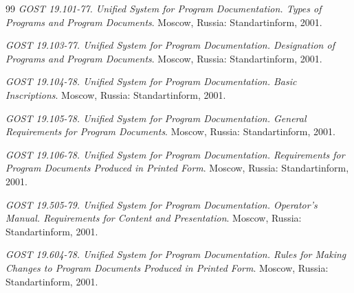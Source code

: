 \documentclass[12pt,a4paper]{extarticle}
\begin{document}
\renewcommand{\refname}{}
\begin{thebibliography}{99}
\emph{GOST 19.101-77. Unified System for Program Documentation. Types of Programs and Program Documents}. Moscow, Russia: Standartinform, 2001.

\emph{GOST 19.103-77. Unified System for Program Documentation. Designation of Programs and Program Documents}. Moscow, Russia: Standartinform, 2001.

\emph{GOST 19.104-78. Unified System for Program Documentation. Basic Inscriptions}. Moscow, Russia: Standartinform, 2001.

\emph{GOST 19.105-78. Unified System for Program Documentation. General Requirements for Program Documents}. Moscow, Russia: Standartinform, 2001.

\emph{GOST 19.106-78. Unified System for Program Documentation. Requirements for Program Documents Produced in Printed Form}. Moscow, Russia: Standartinform, 2001.

\emph{GOST 19.505-79. Unified System for Program Documentation. Operator's Manual. Requirements for Content and Presentation}. Moscow, Russia: Standartinform, 2001.

\emph{GOST 19.604-78. Unified System for Program Documentation. Rules for Making Changes to Program Documents Produced in Printed Form}. Moscow, Russia: Standartinform, 2001.
\end{thebibliography}



\clearpage


\end{document}
